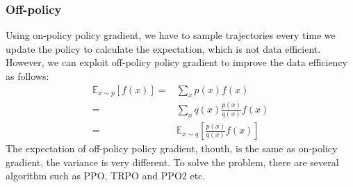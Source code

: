 \documentclass[UTF8, a4paper, 11pt]{article}
\begin{document}
\subsubsection{Off-policy}
Using on-policy policy gradient, we have to sample trajectories every time we update the policy to calculate the expectation, which is not data efficient. However,
we can exploit off-policy policy gradient to improve the data efficiency as follows:
$$\begin{aligned}
\mathbb{E}_{x\sim p}[f(x)]=&\sum_x p(x)f(x)\\
=&\sum_x q(x)\frac{p(x)}{q(x)}f(x)\\
=&\mathbb{E}_{x\sim q}[\frac{p(x)}{q(x)}f(x)]
\end{aligned}$$
The expectation of off-policy policy gradient, thouth, is the same as on-policy gradient, the variance is very different. To solve the problem, there are several
algorithm such as PPO, TRPO and PPO2 etc.
\end{document}

